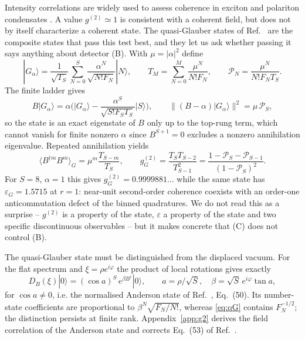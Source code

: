 \documentclass[11pt,a4paper]{article}
\newcommand{\ket}[1]{|#1\rangle}
\begin{document}
Intensity correlations are widely used to assess coherence in exciton and polariton condensates \cite{Deng2010}. A value $g^{(2)}\simeq1$ is consistent with a coherent field, but does not by itself characterize a coherent state. The quasi-Glauber states of Ref.~\cite{Shiau2017} are the composite states that pass this test best, and they let us ask whether passing it says anything about detector (B). With $\mu=|\alpha|^2$ define
\begin{equation}
\ket{G_\alpha}=\frac1{\sqrt{T_S}}\sum_{N=0}^S\frac{\alpha^N}{\sqrt{N!F_N}}\ket N,\qquad
T_M=\sum_{N=0}^M\frac{\mu^N}{N!F_N},\qquad \mathcal P_N=\frac{\mu^N}{N!F_NT_S}.
\label{eq:qG}
\end{equation}
The finite ladder gives
\begin{equation}
B\ket{G_\alpha}=\alpha\Big(\ket{G_\alpha}-\frac{\alpha^S}{\sqrt{S!F_ST_S}}\ket S\Big),\qquad
\|(B-\alpha)\ket{G_\alpha}\|^2=\mu\,\mathcal P_S ,
\label{eq:qGeig}
\end{equation}
so the state is an exact eigenstate of $B$ only up to the top-rung term, which cannot vanish for finite nonzero $\alpha$ since $B^{S+1}=0$ excludes a nonzero annihilation eigenvalue. Repeated annihilation yields
\begin{equation}
\langle B^{\dagger m}B^m\rangle_G=\mu^m\frac{T_{S-m}}{T_S},\qquad
g^{(2)}_G=\frac{T_ST_{S-2}}{T_{S-1}^2}=\frac{1-\mathcal P_S-\mathcal P_{S-1}}{(1-\mathcal P_S)^2}.
\label{eq:g2G}
\end{equation}
For $S=8$, $\alpha=1$ this gives $g^{(2)}_G=0.9999881\ldots$ while the same state has $\varepsilon_G=1.5715$ at $r=1$: near-unit second-order coherence coexists with an order-one anticommutation defect of the binned quadratures. We do not read this as a surprise -- $g^{(2)}$ is a property of the state, $\varepsilon$ a property of the state and two specific discontinuous observables -- but it makes concrete that (C) does not control (B).

The quasi-Glauber state must be distinguished from the displaced vacuum. For the flat spectrum and $\xi=\rho e^{i\varphi}$ the product of local rotations gives exactly
\begin{equation}
D_B(\xi)\ket0=(\cos a)^S\,e^{\beta B^\dagger}\ket0,\qquad a=\rho/\sqrt S,\quad \beta=\sqrt S\,e^{i\varphi}\tan a,
\label{eq:anderson}
\end{equation}
for $\cos a\ne0$, i.e. the normalised Anderson state \cite{Anderson1958} of Ref.~\cite{Shiau2017}, Eq.~(50). Its number-state coefficients are proportional to $\beta^N\sqrt{F_N/N!}$, whereas \eqref{eq:qG} contains $F_N^{-1/2}$; the distinction persists at finite rank. Appendix~\ref{app:g2} derives the field correlation of the Anderson state and corrects Eq.~(53) of Ref.~\cite{Shiau2017}.
\end{document}

